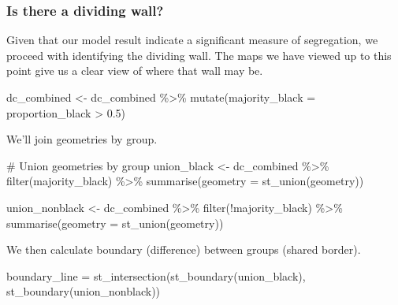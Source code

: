 \documentclass[
  letterpaper,
  DIV=11,
  numbers=noendperiod]{scrartcl}
\newenvironment{Shaded}{\begin{snugshade}}{\end{snugshade}}
\newcommand{\AttributeTok}[1]{\textcolor[rgb]{0.40,0.45,0.13}{#1}}
\newcommand{\CommentTok}[1]{\textcolor[rgb]{0.37,0.37,0.37}{#1}}
\newcommand{\FloatTok}[1]{\textcolor[rgb]{0.68,0.00,0.00}{#1}}
\newcommand{\FunctionTok}[1]{\textcolor[rgb]{0.28,0.35,0.67}{#1}}
\newcommand{\NormalTok}[1]{\textcolor[rgb]{0.00,0.23,0.31}{#1}}
\newcommand{\OtherTok}[1]{\textcolor[rgb]{0.00,0.23,0.31}{#1}}
\newcommand{\SpecialCharTok}[1]{\textcolor[rgb]{0.37,0.37,0.37}{#1}}
\begin{document}
\subsubsection{Is there a dividing
wall?}\label{is-there-a-dividing-wall}

Given that our model result indicate a significant measure of
segregation, we proceed with identifying the dividing wall. The maps we
have viewed up to this point give us a clear view of where that wall may
be.

\begin{Shaded}
\begin{Highlighting}[]
\NormalTok{dc\_combined }\OtherTok{\textless{}{-}}\NormalTok{ dc\_combined }\SpecialCharTok{\%\textgreater{}\%}
  \FunctionTok{mutate}\NormalTok{(}\AttributeTok{majority\_black =}\NormalTok{ proportion\_black }\SpecialCharTok{\textgreater{}} \FloatTok{0.5}\NormalTok{)}
\end{Highlighting}
\end{Shaded}

We'll join geometries by group.

\begin{Shaded}
\begin{Highlighting}[]
\CommentTok{\# Union geometries by group}
\NormalTok{union\_black }\OtherTok{\textless{}{-}}\NormalTok{ dc\_combined }\SpecialCharTok{\%\textgreater{}\%}
  \FunctionTok{filter}\NormalTok{(majority\_black) }\SpecialCharTok{\%\textgreater{}\%}
  \FunctionTok{summarise}\NormalTok{(}\AttributeTok{geometry =} \FunctionTok{st\_union}\NormalTok{(geometry))}

\NormalTok{union\_nonblack }\OtherTok{\textless{}{-}}\NormalTok{ dc\_combined }\SpecialCharTok{\%\textgreater{}\%}
  \FunctionTok{filter}\NormalTok{(}\SpecialCharTok{!}\NormalTok{majority\_black) }\SpecialCharTok{\%\textgreater{}\%}
  \FunctionTok{summarise}\NormalTok{(}\AttributeTok{geometry =} \FunctionTok{st\_union}\NormalTok{(geometry))}
\end{Highlighting}
\end{Shaded}

We then calculate boundary (difference) between groups (shared border).

\begin{Shaded}
\begin{Highlighting}[]
\NormalTok{boundary\_line }\OtherTok{=} 
  \FunctionTok{st\_intersection}\NormalTok{(}\FunctionTok{st\_boundary}\NormalTok{(union\_black), }\FunctionTok{st\_boundary}\NormalTok{(union\_nonblack))}
\end{Highlighting}
\end{Shaded}
\end{document}
